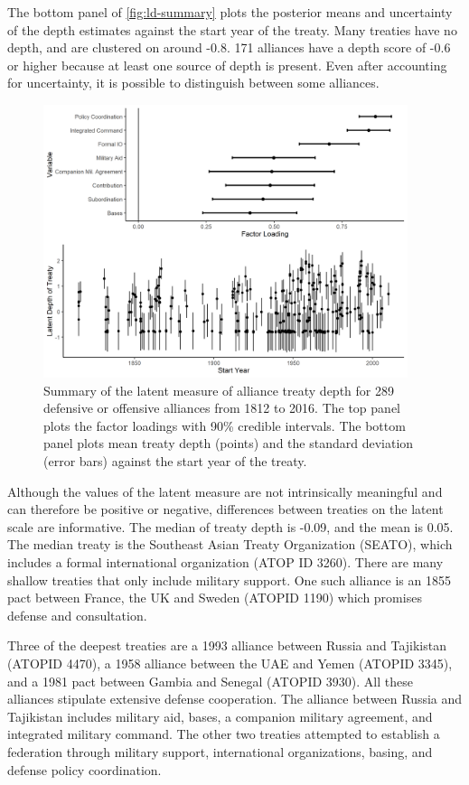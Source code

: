 \documentclass[12pt]{article}
\begin{document}
The bottom panel of \autoref{fig:ld-summary} plots the posterior means and uncertainty of the depth estimates against the start year of the treaty. 
Many treaties have no depth, and are clustered on around -0.8.  
171 alliances have a depth score of -0.6 or higher because at least one source of depth is present. 
Even after accounting for uncertainty, it is possible to distinguish between some alliances. 


\begin{figure}
	\centering
		\includegraphics[width=0.95\textwidth]{../figures/ld-summary.png}
	\caption{Summary of the latent measure of alliance treaty depth for 289 defensive or offensive alliances from 1812 to 2016. The top panel plots the factor loadings with 90\% credible intervals. The bottom panel plots mean treaty depth (points) and the standard deviation (error bars) against the start year of the treaty.}
	\label{fig:ld-summary}
\end{figure}


Although the values of the latent measure are not intrinsically meaningful and can therefore be positive or negative, differences between treaties on the latent scale are informative. 
The median of treaty depth is -0.09, and the mean is 0.05. 
The median treaty is the Southeast Asian Treaty Organization (SEATO), which includes a formal international organization (ATOP ID 3260). 
There are many shallow treaties that only include military support. 
One such alliance is an 1855 pact between France, the UK and Sweden (ATOPID 1190) which promises defense and consultation. 


Three of the deepest treaties are a 1993 alliance between Russia and Tajikistan (ATOPID 4470), a 1958 alliance between the UAE and Yemen (ATOPID 3345), and a 1981 pact between Gambia and Senegal (ATOPID 3930). 
All these alliances stipulate extensive defense cooperation. 
The alliance between Russia and Tajikistan includes military aid, bases, a companion military agreement, and integrated military command. 
The other two treaties attempted to establish a federation through military support, international organizations, basing, and defense policy coordination.
\end{document}
